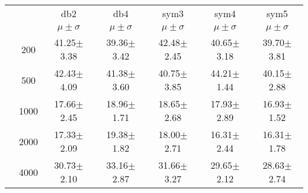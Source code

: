 \begin{table}[H]
\begin{tabular}{|c|c|c c c c c|}
\multicolumn{2}{c|}{}  & db2 & db4 & sym3 & sym4 & sym5 \\\cline{3-7}
\multicolumn{2}{c|}{}& $\mu \pm \sigma$ & $\mu \pm \sigma$ & $\mu \pm \sigma$ & $\mu \pm \sigma$ & $\mu \pm \sigma$ \\\hline

\multicolumn{1}{|c|}{ \multirow{5}{*}{\rotatebox[origin=c]{90}{\textbf{Neurônios}}} }
&200	&41.25$\pm$3.38		&39.36$\pm$3.42		&42.48$\pm$2.45	&40.65$\pm$3.18	&39.70$\pm$3.81  \\\cline{2-7}

&500	&42.43$\pm$4.09		&41.38$\pm$3.60		&40.75$\pm$3.85	& 44.21$\pm$1.44	&40.15$\pm$2.88 \\\cline{2-7}

&1000	&17.66$\pm$2.45		&18.96$\pm$1.71		&18.65$\pm$2.68	&17.93$\pm$2.89	&16.93$\pm$1.52 \\\cline{2-7}

&2000	&17.33$\pm$2.09		&19.38$\pm$1.82		&18.00$\pm$2.71	&16.31$\pm$2.44	&16.31$\pm$1.78 \\\cline{2-7}

&4000 &30.73$\pm$2.10		&33.16$\pm$2.87	&31.66$\pm$3.27	&29.65$\pm$2.12	&28.63$\pm$2.74 \\\midrule




	\end{tabular}
\end{table}














